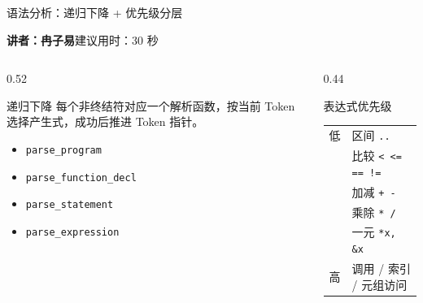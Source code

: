 \documentclass[aspectratio=169]{ctexbeamer}
\newcommand{\speaker}[2]{%
    \vspace{-0.4em}
    \begin{flushright}
        \scriptsize\color{mainblue}\textbf{讲者：#1}\quad 建议用时：#2
    \end{flushright}
    \vspace{-0.7em}
}
\begin{document}
\begin{frame}{语法分析：递归下降 + 优先级分层}
    \speaker{冉子易}{30 秒}
    \begin{columns}[T]
    \begin{column}{0.52\textwidth}
        \begin{block}{递归下降}
            每个非终结符对应一个解析函数，按当前 Token 选择产生式，成功后推进 Token 指针。
        \end{block}
        \begin{itemize}
            \item \texttt{parse\_program}
            \item \texttt{parse\_function\_decl}
            \item \texttt{parse\_statement}
            \item \texttt{parse\_expression}
        \end{itemize}
    \end{column}
    \begin{column}{0.44\textwidth}
        \begin{block}{表达式优先级}
            \small
            \begin{tabular}{ll}
                低 & 区间 \texttt{..} \\
                   & 比较 \texttt{< <= == !=} \\
                   & 加减 \texttt{+ -} \\
                   & 乘除 \texttt{* /} \\
                   & 一元 \texttt{*x, \&x} \\
                高 & 调用 / 索引 / 元组访问 \\
            \end{tabular}
        \end{block}
    \end{column}
    \end{columns}
\end{frame}
\end{document}
